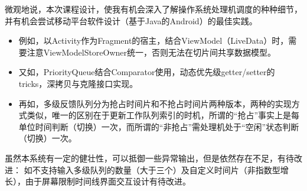 \documentclass[UTF8]{ctexart}
\begin{document}
微观地说，本次课程设计，使我有机会深入了解操作系统处理机调度的种种细节，并有机会尝试移动平台软件设计（基于Java的Android）的最佳实践。
\begin{itemize}
    \item 例如，以Activity作为Fragment的宿主，结合ViewModel（LiveData）时，需要注意ViewModelStoreOwner统一，否则无法在切片间共享数据模型。
    \item 又如，PriorityQueue结合Comparator使用，动态优先级getter/setter的tricks，深拷贝与克隆接口实现。
    \item 再如，多级反馈队列分为抢占时间片和不抢占时间片两种版本，两种的实现方式类似，唯一的区别在于更新工作队列索引的时机，所谓的“抢占”事实上是每单位时间判断（切换）一次，而所谓的“非抢占”需处理机处于“空闲”状态判断（切换）一次。
\end{itemize}

虽然本系统有一定的健壮性，可以抵御一些异常输出，但是依然存在不足，有待改进：
如不支持输入多级队列的数量（大于三个）及自定义时间片（非指数型增长），由于屏幕限制时间线界面交互设计有待改进。
\end{document}
